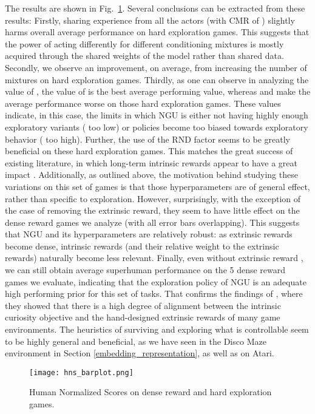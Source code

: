 \documentclass{article} \usepackage{iclr2020_conference,times}
\begin{document}
The results are shown in Fig.~\ref{fig_ablations}. Several conclusions can be extracted from these results: 
Firstly, sharing experience from all the actors (with CMR of ) slightly harms overall average performance on hard exploration games. This suggests that the power of acting differently for different conditioning mixtures is mostly acquired through the shared weights of the model rather than shared data.
Secondly, we observe an improvement, on average, from increasing the number of mixtures  on hard exploration games.
Thirdly, as one can observe in analyzing the value of , the value of  is the best average performing value, whereas  and  make the average performance worse on those hard exploration games. These values indicate, in this case, the limits in which NGU is either not having highly enough exploratory variants ( too low) or policies become too biased towards exploratory behavior ( too high).
Further, the use of the RND factor seems to be greatly beneficial on these hard exploration games. This matches the great success of existing literature, in which long-term intrinsic rewards appear to have a great impact \citep{bellemare2016unifying, ostrovski2017count, choi2018contingency}.
Additionally, as outlined above, the motivation behind studying these variations on this set of  games is that those hyperparameters are of general effect, rather than specific to exploration. However, surprisingly, with the exception of the case of removing the extrinsic reward, they seem to have little effect on the dense reward games we analyze (with all error bars overlapping). This suggests that NGU and its hyperparameters are relatively robust: as extrinsic rewards become dense, intrinsic rewards (and their relative weight to the extrinsic rewards) naturally become less relevant.
Finally, even without extrinsic reward , we can still obtain average superhuman performance on the 5 dense reward games we evaluate, indicating that the exploration policy of NGU is an adequate high performing prior for this set of tasks.
That confirms the findings of \citet{burda2018large}, where they showed that there is a high degree of alignment between the intrinsic curiosity objective and the hand-designed extrinsic rewards of many game environments.
The heuristics of surviving and exploring what is controllable seem to be highly general and beneficial, as we have seen in the Disco Maze environment in Section \ref{embedding_representation}, as well as on Atari.

\begin{figure}
    \centering
    \texttt{[image: hns\_barplot.png]} 
    \vspace{-2ex}
    \caption{Human Normalized Scores on dense reward and hard exploration games.} 
    \label{fig_ablations}
\vspace{-1ex}
\end{figure}
\end{document}
